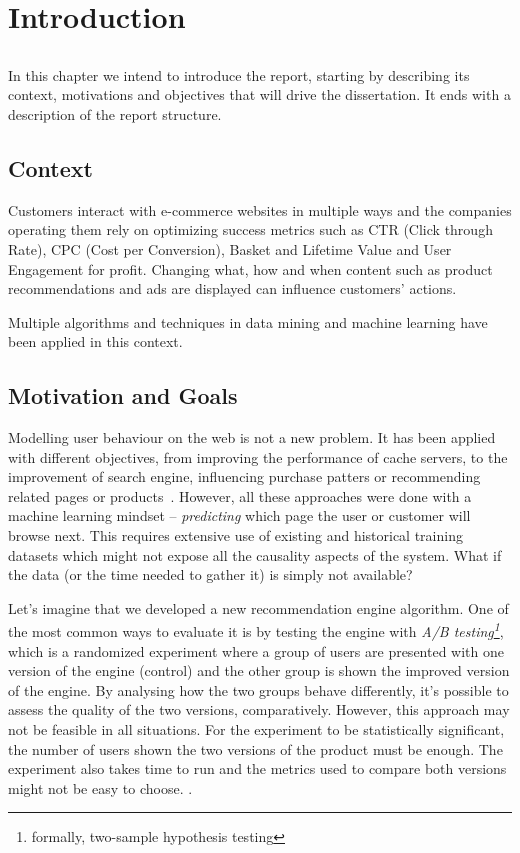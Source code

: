 \chapter{Introduction} \label{chap:intro}

\section*{}

In this chapter we intend to introduce the report, starting by describing its 
context, motivations and objectives that will drive the dissertation. It ends 
with a description of the report structure.

\section{Context} \label{sec:context}

Customers interact with e-commerce websites in multiple ways and the companies
operating them rely on optimizing success metrics such as CTR (Click
through Rate), CPC (Cost per Conversion), Basket and Lifetime Value and User
Engagement for profit. Changing what, how and when content such as product
recommendations and ads are displayed can influence customers' actions.

Multiple algorithms and techniques in data mining and machine learning
have been applied in this context.

\section{Motivation and Goals} \label{sec:goals}

Modelling user behaviour on the web is not a new problem. It has been applied 
with different objectives, from improving the performance of cache 
servers, to the improvement of search engine, influencing purchase patters or 
recommending related pages or products~\cite{Deshpande2001, 
JSrivastavaRCooley2000}. However, all these approaches were done with a machine 
learning mindset -- \textit{predicting} which page the user or customer will 
browse next. This requires extensive use of existing and historical training 
datasets which might not expose all the causality aspects of the system. What 
if the data (or the time needed to gather it) is simply not available?

Let's imagine that we developed a new recommendation engine algorithm. One of 
the most common ways to evaluate it is by testing the engine with \textit{A/B 
testing\footnote{formally, two-sample hypothesis testing}}, which is a 
randomized experiment where a group of users are presented with one version of 
the engine (control) and the other group is shown the improved version of the 
engine. By analysing how the two groups behave differently, it's possible to 
assess the quality of the two versions, comparatively. However, this approach 
may not be feasible in all situations. For the experiment to be statistically 
significant, the number of users shown the two versions of the product must be 
enough. The experiment also takes time to run and the metrics used to compare 
both versions might not be easy to choose. \cite{Quora2015}.

